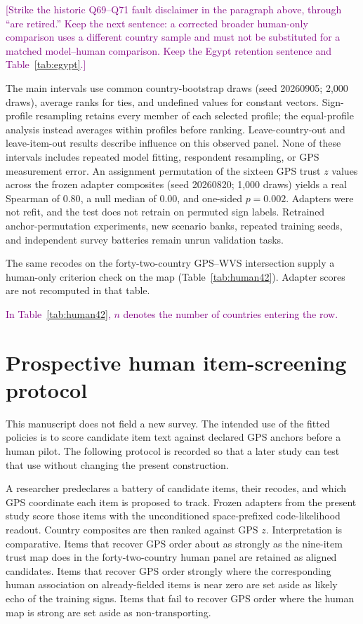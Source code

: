 \textcolor{purple}{[Strike the historic Q69--Q71 fault disclaimer in the paragraph above, through ``are retired.'' Keep the next sentence: a corrected broader human-only comparison uses a different country sample and must not be substituted for a matched model--human comparison. Keep the Egypt retention sentence and Table~\ref{tab:egypt}.]}


The main intervals use common country-bootstrap draws (seed 20260905; 2,000 draws), average ranks for ties, and undefined values for constant vectors. Sign-profile resampling retains every member of each selected profile; the equal-profile analysis instead averages within profiles before ranking. Leave-country-out and leave-item-out results describe influence on this observed panel. None of these intervals includes repeated model fitting, respondent resampling, or GPS measurement error. An assignment permutation of the sixteen GPS trust $z$ values across the frozen adapter composites (seed 20260820; 1,000 draws) yields a real Spearman of $0.80$, a null median of $0.00$, and one-sided $p=0.002$. Adapters were not refit, and the test does not retrain on permuted sign labels. Retrained anchor-permutation experiments, new scenario banks, repeated training seeds, and independent survey batteries remain unrun validation tasks.

The same recodes on the forty-two-country GPS--WVS intersection supply a human-only criterion check on the map (Table~\ref{tab:human42}). Adapter scores are not recomputed in that table.

\textcolor{purple}{In Table~\ref{tab:human42}, $n$ denotes the number of countries entering the row.}



\section{Prospective human item-screening protocol}\label{app:humanscreen}
This manuscript does not field a new survey. The intended use of the fitted policies is to score candidate item text against declared GPS anchors before a human pilot. The following protocol is recorded so that a later study can test that use without changing the present construction.

A researcher predeclares a battery of candidate items, their recodes, and which GPS coordinate each item is proposed to track. Frozen adapters from the present study score those items with the unconditioned space-prefixed code-likelihood readout. Country composites are then ranked against GPS $z$. Interpretation is comparative. Items that recover GPS order about as strongly as the nine-item trust map does in the forty-two-country human panel are retained as aligned candidates. Items that recover GPS order strongly where the corresponding human association on already-fielded items is near zero are set aside as likely echo of the training signs. Items that fail to recover GPS order where the human map is strong are set aside as non-transporting.

